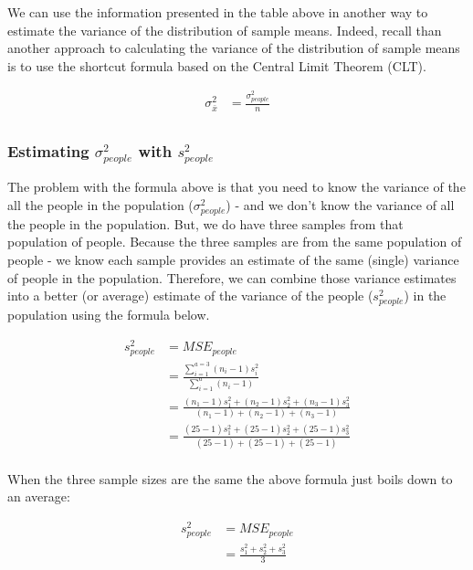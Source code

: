\documentclass[
]{krantz}
\begin{document}
We can use the information presented in the table above in another way to estimate the variance of the distribution of sample means. Indeed, recall than another approach to calculating the variance of the distribution of sample means is to use the shortcut formula based on the Central Limit Theorem (CLT).

\[
\begin{aligned} 
\sigma_{\bar{x}}^2 &= \frac{\sigma_{people}^2}{n}\\
\end{aligned} 
\]

\hypertarget{estimating-sigma_people2-with-s_people2}{%
\subsubsection{\texorpdfstring{Estimating \(\sigma_{people}^2\) with \(s_{people}^2\)}{Estimating \textbackslash sigma\_\{people\}\^{}2 with s\_\{people\}\^{}2}}\label{estimating-sigma_people2-with-s_people2}}

The problem with the formula above is that you need to know the variance of the all the people in the population (\(\sigma_{people}^2\)) - and we don't know the variance of all the people in the population. But, we do have three samples from that population of people. Because the three samples are from the same population of people - we know each sample provides an estimate of the same (single) variance of people in the population. Therefore, we can combine those variance estimates into a better (or average) estimate of the variance of the people (\(s_{people}^2\)) in the population using the formula below.

\[
\begin{aligned}
s_{people}^2 &= MSE_{people}\\
&= \frac{\sum_{i=1}^{a=3}(n_i-1)s_i^2}{\sum_{i=1}^{a}(n_i-1)} \\
&= \frac{(n_1-1)s_1^2 + (n_2-1)s_2^2 + (n_3-1)s_3^2}{(n_1-1)+(n_2-1)+(n_3-1)} \\
&= \frac{(25-1)s_1^2 + (25-1)s_2^2 + (25-1)s_3^2}{(25-1)+(25-1)+(25-1)} \\
\end{aligned}
\]

When the three sample sizes are the same the above formula just boils down to an average:

\[
\begin{aligned}
s_{people}^2 &= MSE_{people}\\
&= \frac{s_1^2 + s_2^2 + s_3^2}{3} \\
\end{aligned}
\]
\end{document}
